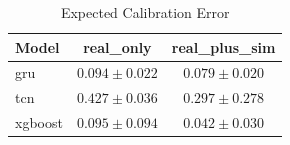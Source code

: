 \begin{table}[htbp]
\centering
\caption{Expected Calibration Error}
\label{tab:ece}
\begin{tabular}{lcc}
\hline
Model & real_only & real_plus_sim \\
\hline
gru & $0.094 \pm 0.022$ & $0.079 \pm 0.020$ \\
tcn & $0.427 \pm 0.036$ & $0.297 \pm 0.278$ \\
xgboost & $0.095 \pm 0.094$ & $0.042 \pm 0.030$ \\
\hline
\end{tabular}
\end{table}